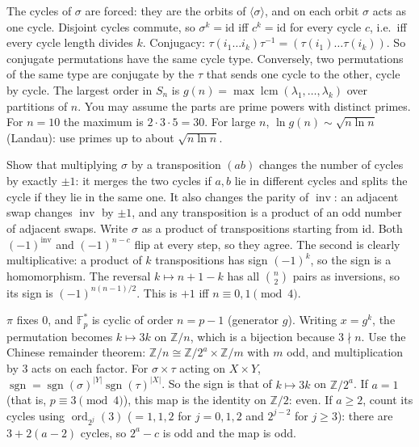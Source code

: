 \documentclass[11pt,a4paper]{article}
\begin{document}

 The cycles of $\sigma$ are forced: they are the orbits of $\langle\sigma\rangle$, and on each orbit $\sigma$ acts as one cycle. Disjoint cycles commute, so $\sigma^k=\mathrm{id}$ iff $c^k=\mathrm{id}$ for every cycle $c$, i.e.\ iff every cycle length divides $k$.
 Conjugacy: $\tau(i_1\dots i_k)\tau^{-1}=(\tau(i_1)\dots\tau(i_k))$. So conjugate permutations have the same cycle type. Conversely, two permutations of the same type are conjugate by the $\tau$ that sends one cycle to the other, cycle by cycle.
 The largest order in $S_n$ is $g(n)=\max\operatorname{lcm}(\lambda_1,\dots,\lambda_k)$ over partitions of $n$. You may assume the parts are prime powers with distinct primes. For $n=10$ the maximum is $2\cdot3\cdot5=30$. For large $n$, $\ln g(n)\sim\sqrt{n\ln n}$ (Landau): use primes up to about $\sqrt{n\ln n}$.

 Show that multiplying $\sigma$ by a transposition $(ab)$ changes the number of cycles by exactly $\pm1$: it merges the two cycles if $a,b$ lie in different cycles and splits the cycle if they lie in the same one. It also changes the parity of $\operatorname{inv}$: an adjacent swap changes $\operatorname{inv}$ by $\pm1$, and any transposition is a product of an odd number of adjacent swaps.
 Write $\sigma$ as a product of transpositions starting from $\mathrm{id}$. Both $(-1)^{\operatorname{inv}}$ and $(-1)^{n-c}$ flip at every step, so they agree. The second is clearly multiplicative: a product of $k$ transpositions has sign $(-1)^k$, so the sign is a homomorphism.
 The reversal $k\mapsto n+1-k$ has all $\binom n2$ pairs as inversions, so its sign is $(-1)^{n(n-1)/2}$. This is $+1$ iff $n\equiv0,1\pmod4$.

 $\pi$ fixes $0$, and $\mathbb F_p^*$ is cyclic of order $n=p-1$ (generator $g$). Writing $x=g^k$, the permutation becomes $k\mapsto3k$ on $\mathbb Z/n$, which is a bijection because $3\nmid n$.
 Use the Chinese remainder theorem: $\mathbb Z/n\cong\mathbb Z/2^a\times\mathbb Z/m$ with $m$ odd, and multiplication by $3$ acts on each factor. For $\sigma\times\tau$ acting on $X\times Y$, $\operatorname{sgn}=\operatorname{sgn}(\sigma)^{|Y|}\operatorname{sgn}(\tau)^{|X|}$. So the sign is that of $k\mapsto3k$ on $\mathbb Z/2^a$.
 If $a=1$ (that is, $p\equiv3\pmod4$), this map is the identity on $\mathbb Z/2$: even. If $a\ge2$, count its cycles using $\operatorname{ord}_{2^j}(3)$ ($=1,1,2$ for $j=0,1,2$ and $2^{j-2}$ for $j\ge3$): there are $3+2(a-2)$ cycles, so $2^a-c$ is odd and the map is odd.
\end{document}
